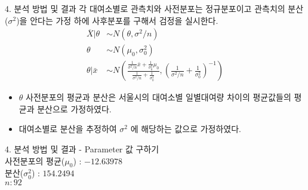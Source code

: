\documentclass[mathserif]{beamer}
\begin{document}
\begin{frame}{4. 분석 방법 및 결과}
각 대여소별로 관측치와 사전분포는 정규분포이고 관측치의 분산($\sigma^2$)을 안다는 가정 하에 사후분포를 구해서 검정을 실시한다.
\begin{align*}
    \overline{X}|\theta & \sim N(\theta,\sigma^2/n)\\
    \theta & \sim N(\mu_0,\sigma^2_0)\\
    \theta|\bar{x} & \sim N\left(\frac{\frac{1}{\sigma^2\slash n}\bar{x}+\frac{1}{\sigma^2_0}\mu_0}{\frac{1}{\sigma^2\slash n}+\frac{1}{\sigma^2_0}},\left(\frac{1}{\sigma^2\slash n}+\frac{1}{\sigma^2_0}\right)^{-1}\right)
\end{align*}

\begin{itemize}
    \item $\theta$ 사전분포의 평균과 분산은 서울시의 대여소별 일별대여량 차이의 평균값들의 평균과 분산으로 가정하였다.
    \item 대여소별로 분산을 추정하여 $\sigma^2$ 에 해당하는 값으로 가정하였다.
\end{itemize}
\end{frame}

\begin{frame}{4. 분석 방법 및 결과}
- Parameter 값 구하기\\
\vspace{3mm}
사전분포의 평균($\mu_0$) : $-12.63978$\\ 분산($\sigma^2_0$) : $154.2494$\\ $n : 92$
\begin{table}[]
\end{table}
\end{frame}
\end{document}
